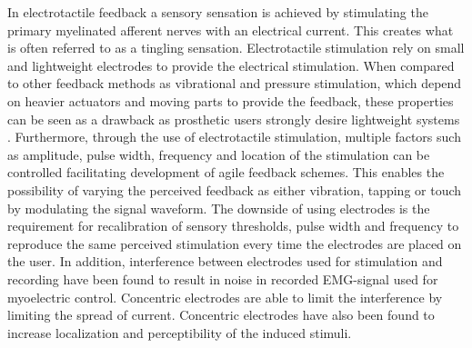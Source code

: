 In electrotactile feedback a sensory sensation is achieved by stimulating the primary myelinated afferent nerves with an electrical current. This creates what is often referred to as a tingling sensation. Electrotactile stimulation rely on small and lightweight electrodes to provide the electrical stimulation. When compared to other feedback methods as vibrational and pressure stimulation, which depend on heavier actuators and moving parts to provide the feedback, these properties can be seen as a drawback as prosthetic users strongly desire lightweight systems \cite{Stephens-Fripp2018,Benz2016}. Furthermore, through the use of electrotactile stimulation, multiple factors such as amplitude, pulse width, frequency and location of the stimulation can be controlled facilitating development of agile feedback schemes. This enables the possibility of varying the perceived feedback as either vibration, tapping or touch by modulating the signal waveform. The downside of using electrodes is the requirement for recalibration of sensory thresholds, pulse width and frequency to reproduce the same perceived stimulation every time the electrodes are placed on the user. In addition, interference between electrodes used for stimulation and recording have been found to result in noise in recorded EMG-signal used for myoelectric control. Concentric electrodes are able to limit the interference by limiting the spread of current. Concentric electrodes have also been found to increase localization and perceptibility of the induced stimuli. \cite{Schofield2014,Stephens-Fripp2018,Antfolk2018} 







